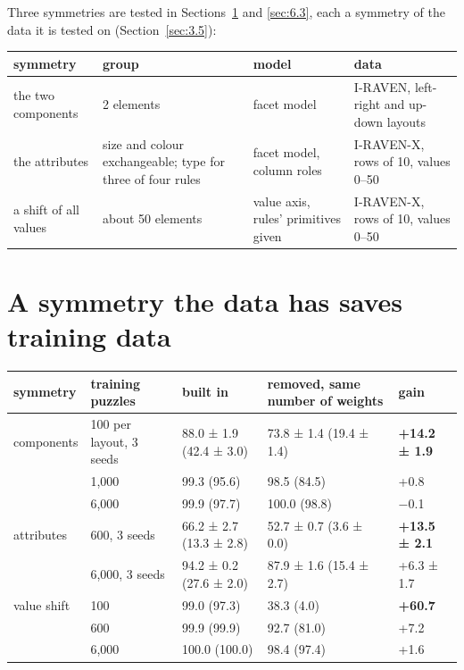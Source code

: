 Three symmetries are tested in Sections~\ref{sec:6.2} and \ref{sec:6.3}, each a symmetry of the data it is tested on (Section~\ref{sec:3.5}):

\begin{center}\small
\begin{tabularx}{\linewidth}{@{}YYYY@{}}
\toprule
symmetry & group & model & data \\
\midrule
the two components & 2 elements & facet model & I-RAVEN, left-right and up-down layouts \\
the attributes & size and colour exchangeable; type for three of four rules & facet model, column roles & I-RAVEN-X, rows of 10, values 0–50 \\
a shift of all values & about 50 elements & value axis, rules' primitives given & I-RAVEN-X, rows of 10, values 0–50 \\
\bottomrule
\end{tabularx}
\end{center}

\section{A symmetry the data has saves training data}\label{sec:6.2}

\begin{center}\small
\begin{tabularx}{\linewidth}{@{}lYYYl@{}}
\toprule
symmetry & training puzzles & built in & removed, same number of weights & gain \\
\midrule
components & 100 per layout, 3 seeds & 88.0 ± 1.9 (42.4 ± 3.0) & 73.8 ± 1.4 (19.4 ± 1.4) & \textbf{+14.2 ± 1.9} \\
 & 1,000 & 99.3 (95.6) & 98.5 (84.5) & +0.8 \\
 & 6,000 & 99.9 (97.7) & 100.0 (98.8) & −0.1 \\
attributes & 600, 3 seeds & 66.2 ± 2.7 (13.3 ± 2.8) & 52.7 ± 0.7 (3.6 ± 0.0) & \textbf{+13.5 ± 2.1} \\
 & 6,000, 3 seeds & 94.2 ± 0.2 (27.6 ± 2.0) & 87.9 ± 1.6 (15.4 ± 2.7) & +6.3 ± 1.7 \\
value shift & 100 & 99.0 (97.3) & 38.3 (4.0) & \textbf{+60.7} \\
 & 600 & 99.9 (99.9) & 92.7 (81.0) & +7.2 \\
 & 6,000 & 100.0 (100.0) & 98.4 (97.4) & +1.6 \\
\bottomrule
\end{tabularx}
\end{center}

